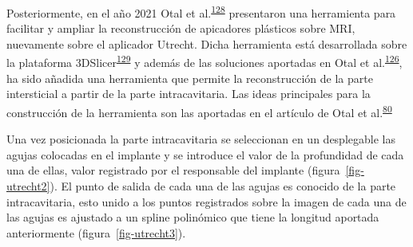 \documentclass[
  a4paper,
]{scrreprt}
\begin{document}
Posteriormente, en el año 2021 Otal et
al.\textsuperscript{\protect\hyperlink{ref-otal2021}{128}} presentaron
una herramienta para facilitar y ampliar la reconstrucción de apicadores
plásticos sobre MRI, nuevamente sobre el aplicador Utrecht. Dicha
herramienta está desarrollada sobre la plataforma
3DSlicer\textsuperscript{\protect\hyperlink{ref-fedorov2012}{129}} y
además de las soluciones aportadas en Otal et
al.\textsuperscript{\protect\hyperlink{ref-otal2019_plastic}{126}}, ha
sido añadida una herramienta que permite la reconstrucción de la parte
intersticial a partir de la parte intracavitaria. Las ideas principales
para la construcción de la herramienta son las aportadas en el artículo
de Otal et al.\textsuperscript{\protect\hyperlink{ref-otal2017}{80}}

Una vez posicionada la parte intracavitaria se seleccionan en un
desplegable las agujas colocadas en el implante y se introduce el valor
de la profundidad de cada una de ellas, valor registrado por el
responsable del implante (figura~\ref{fig-utrecht2}). El punto de salida
de cada una de las agujas es conocido de la parte intracavitaria, esto
unido a los puntos registrados sobre la imagen de cada una de las agujas
es ajustado a un spline polinómico que tiene la longitud aportada
anteriormente (figura~\ref{fig-utrecht3}).
\end{document}

